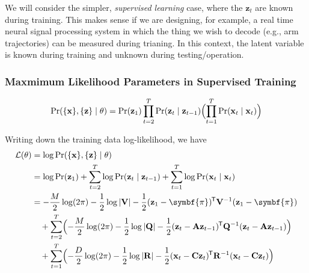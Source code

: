 \documentclass[11pt]{article}
\newcommand{\logdet}[1]{\log \left| {#1} \right| }
\newcommand{\xb}{\mathbf{x}}
\newcommand{\zb}{\mathbf{z}}
\newcommand{\Ab}{\mathbf{A}}
\newcommand{\Qb}{\mathbf{Q}}
\newcommand{\Cb}{\mathbf{C}}
\newcommand{\Rb}{\mathbf{R}}
\newcommand*{\tran}{^{\mkern-1.5mu\mathsf{T}}}
\begin{document}
We will consider the simpler, \textit{supervised learning} case, where the
$\zb_t$ are known during training. This makes sense if we are designing, for
example, a real time neural signal processing system in which the thing we wish
to decode (e.g., arm trajectories) can be measured during trianing. In this
context, the latent variable is known during training and unknown during
testing/operation.

\subsubsection{Maxmimum Likelihood Parameters in Supervised Training}
\begin{equation*}
  \Pr(\{\xb\}, \{\zb\} \mid \theta) = \Pr(\zb_1)
    \prod_{t=2}^T \Pr(\zb_t \mid \zb_{t-1})
    \Bigl(\prod_{t=1}^T \Pr(\xb_t \mid \xb_t)\Bigr)
\end{equation*}

Writing down the training data log-likelihood, we have
\begin{align*}
  \mathcal{L}(\theta) &= \log \Pr(\{\xb\}, \{\zb\} \mid \theta) \\
  &= \log \Pr(\zb_1) +
    \sum_{t=2}^T \log \Pr(\zb_t \mid \zb_{t-1}) +
    \sum_{t=1}^T \log \Pr(\xb_t \mid \xb_t) \\
  &= - \frac{M}{2} \log(2 \pi) - \frac{1}{2} \logdet{\mathbf{V}}
       - \frac{1}{2} (\zb_1 - \symbf{\pi})\tran \mathbf{V}^{-1} (\zb_1 - \symbf{\pi}) \\
  &\quad
     + \sum_{t=2}^T \Bigl(-\frac{M}{2} \log(2 \pi) - \frac{1}{2} \logdet{\Qb}
       -\frac{1}{2} (\zb_t - \Ab\zb_{t-1})\tran \Qb^{-1} (\zb_t - \Ab\zb_{t-1})
       \Bigr)\\
&\quad
     + \sum_{t=1}^T \Bigl(-\frac{D}{2} \log(2 \pi) - \frac{1}{2} \logdet{\Rb}
       -\frac{1}{2} (\xb_t - \Cb\zb_t)\tran \Rb^{-1} (\xb_t - \Cb\zb_t) \Bigr)
\end{align*}
\end{document}
